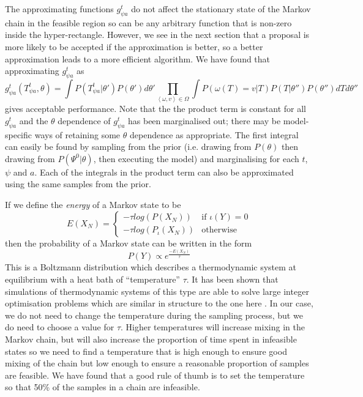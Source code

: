 \documentclass{article}
\begin{document}
The approximating functions $g^t_{\psi a}$ do not affect the stationary state of the Markov chain in the feasible region so can be any arbitrary function that is non-zero inside the hyper-rectangle. However, we see in the next section that a proposal is more likely to be accepted if the approximation is better, so a better approximation leads to a more efficient algorithm. We have found that approximating $g^t_{\psi a}$ as 
\[
g^t_{\psi a}(T^t_{\psi a},\theta) = \int P(T^t_{\psi a}|\theta')P(\theta')d\theta' \prod_{\left<\omega,v\right> \in \Omega} \int P(\omega(T)=v|T)P(T|\theta'')P(\theta'') dT  d\theta''
\]
gives acceptable performance. Note that the the product term is constant for all $g^t_{\psi a}$ and the $\theta$ dependence of $g^t_{\psi a}$ has been marginalised out; there may be model-specific ways of retaining some $\theta$ dependence as appropriate. The first integral can easily be found by sampling from the prior (i.e. drawing from $P(\theta)$  then drawing from $P(\Psi^0|\theta)$, then executing the model) and marginalising for each $t$, $\psi$ and $a$. Each of the integrals in the product term can also be approximated using the same samples from the prior.

If we define the \textit{energy} of a Markov state to be
\[
E(X_N) =
\begin{cases}
-\tau log(P(X_N)) & \text{if }  \iota(Y) = 0\\
-\tau log(P_\iota(X_N)) & \text{otherwise}
\end{cases}
\]
then the probability of a Markov state can be written in the form
\begin{equation}
P(Y) \propto e^{\frac{-E(X_N)}{\tau}}
\end{equation}
This is a Boltzmann distribution which describes a thermodynamic system at equilibrium with a heat bath of ``temperature'' $\tau$. It has been shown that simulations of thermodynamic systems of this type are able to solve large integer optimisation problems which are similar in structure to the one here \citep{kirkpatrick1983optimization}. In our case, we do not need to change the temperature during the sampling process, but we do need to choose a value for $\tau$. Higher temperatures will increase mixing in the Markov chain, but will also increase the proportion of time spent in infeasible states so we need to find a temperature that is high enough to ensure good mixing of the chain but low enough to ensure a reasonable proportion of samples are feasible. We have found that a good rule of thumb is to set the temperature so that 50\% of the samples in a chain are infeasible.
\end{document}
